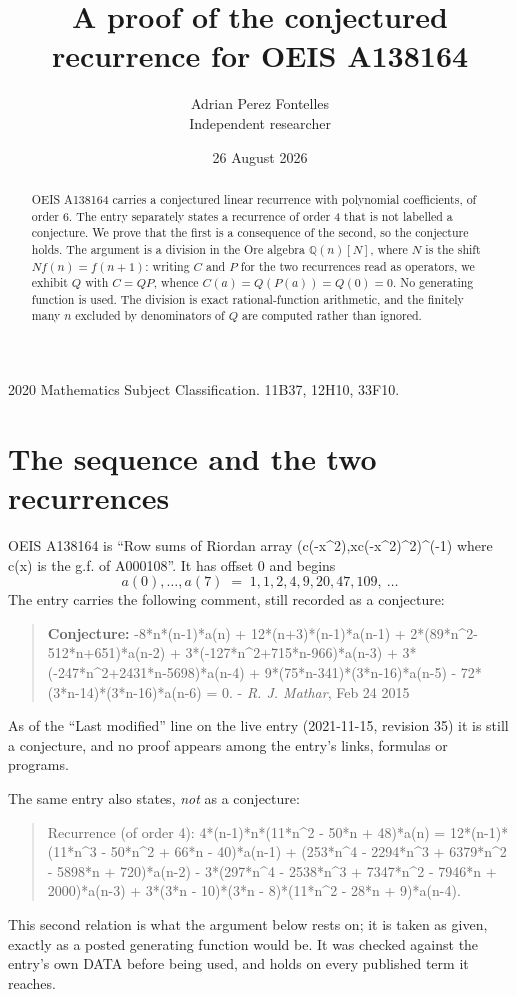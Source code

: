 \documentclass[11pt,a4paper]{article}
\title{A proof of the conjectured recurrence for OEIS A138164}
\author{Adrian Perez Fontelles\\ \small Independent researcher}
\date{26 August 2026}
\theoremstyle{plain}
\theoremstyle{definition}
\begin{document}
\maketitle

\begin{abstract}
OEIS A138164 carries a conjectured linear recurrence with polynomial coefficients, of
order 6. The entry separately states a recurrence of order 4 that is not
labelled a conjecture. We prove that the first is a consequence of the second, so the
conjecture holds. The argument is a division in the Ore algebra
$\mathbb{Q}(n)[N]$, where $N$ is the shift $Nf(n)=f(n+1)$: writing $C$ and $P$ for the two
recurrences read as operators, we exhibit $Q$ with $C=QP$, whence
$C(a)=Q(P(a))=Q(0)=0$. No generating function is used. The division is exact
rational-function arithmetic, and the finitely many $n$ excluded by denominators of $Q$
are computed rather than ignored.
\end{abstract}

\noindent\small 2020 Mathematics Subject Classification. 11B37, 12H10, 33F10.\normalsize

\section{The sequence and the two recurrences}

OEIS A138164 is ``Row sums of Riordan array (c(-x\^{}2),xc(-x\^{}2)\^{}2)\^{}(-1) where c(x) is the g.f. of A000108''. It has offset $0$ and begins
\[
a(0),\dots,a(7)\;=\;1, 1, 2, 4, 9, 20, 47, 109,\ \dots
\]
The entry carries the following comment, still recorded as a conjecture:
\begin{quote}\small
\textbf{Conjecture:} -8*n*(n-1)*a(n) + 12*(n+3)*(n-1)*a(n-1) + 2*(89*n\^{}2-512*n+651)*a(n-2) + 3*(-127*n\^{}2+715*n-966)*a(n-3) + 3*(-247*n\^{}2+2431*n-5698)*a(n-4) + 9*(75*n-341)*(3*n-16)*a(n-5) - 72*(3*n-14)*(3*n-16)*a(n-6) = 0. - \emph{R. J. Mathar}, Feb 24 2015
\end{quote}
As of the ``Last modified'' line on the live entry (2021-11-15, revision 35) it is still
a conjecture, and no proof appears among the entry's links, formulas or programs.

The same entry also states, \emph{not} as a conjecture:
\begin{quote}\small
Recurrence (of order 4): 4*(n-1)*n*(11*n\^{}2 - 50*n + 48)*a(n) = 12*(n-1)*(11*n\^{}3 - 50*n\^{}2 + 66*n - 40)*a(n-1) + (253*n\^{}4 - 2294*n\^{}3 + 6379*n\^{}2 - 5898*n + 720)*a(n-2) - 3*(297*n\^{}4 - 2538*n\^{}3 + 7347*n\^{}2 - 7946*n + 2000)*a(n-3) + 3*(3*n - 10)*(3*n - 8)*(11*n\^{}2 - 28*n + 9)*a(n-4).
\end{quote}
This second relation is what the argument below rests on; it is taken as given, exactly as
a posted generating function would be. It was checked against the entry's own DATA before
being used, and holds on every published term it reaches.
\end{document}
